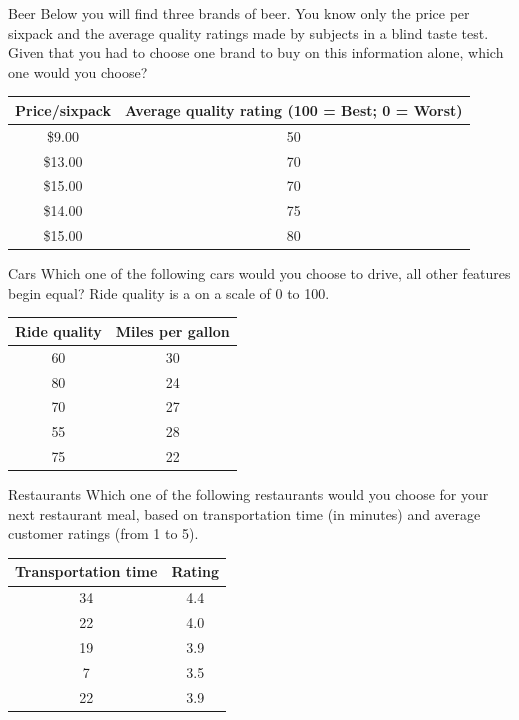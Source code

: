 \documentclass{beamer}
\begin{document}
\begin{frame}{Beer}
Below you will find three brands of beer.
You know only the price per sixpack and the average quality ratings made by subjects in a blind taste test.
Given that you had to choose one brand to buy on this information alone, which one would you choose?

\vspace{0.5cm}
\begin{tabular}{cc}
\hline
Price/sixpack & Average quality rating (100 = Best; 0 = Worst) \\ 
\hline
\$9.00 & 50 \\ 
\$13.00 & 70 \\ 
\$15.00 & 70 \\ 
\$14.00 & 75 \\ 
\$15.00 & 80 \\ \hline
\end{tabular}
\end{frame}

\begin{frame}{Cars}
Which one of the following cars would you choose to drive, all other features
begin equal? Ride quality is a on a scale of 0 to 100.

\vspace{0.5cm}
\begin{center}
\begin{tabular}{cc}
\hline
Ride quality & Miles per gallon \\ \hline
60 & 30 \\ 
80 & 24 \\ 
70 & 27 \\ 
55 & 28 \\ 
75 & 22 \\ \hline
\end{tabular}
\end{center}
\end{frame}

\begin{frame}{Restaurants}
Which one of the following restaurants would you choose for your next restaurant meal, based on transportation time (in minutes) and average customer ratings (from
1 to 5).

\vspace{0.5cm}
\begin{center}
\begin{tabular}{cc}
\hline
Transportation time & Rating \\ \hline
34 & 4.4 \\ 
22 & 4.0 \\ 
19 & 3.9 \\ 
7 & 3.5 \\ 
22 & 3.9 \\ \hline
\end{tabular}
\end{center}
\end{frame}
\end{document}
